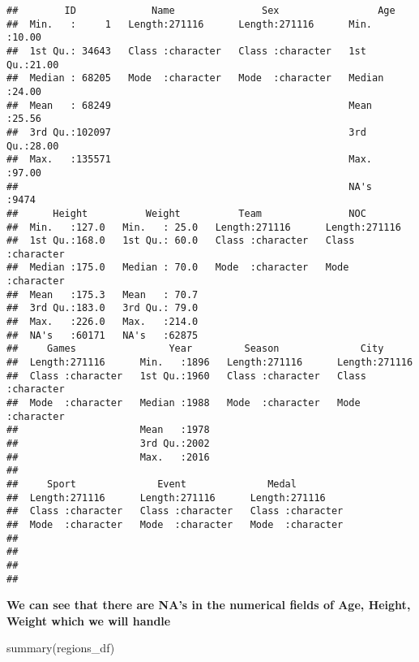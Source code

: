 \documentclass[
]{article}
\newenvironment{Shaded}{\begin{snugshade}}{\end{snugshade}}
\newcommand{\FunctionTok}[1]{\textcolor[rgb]{0.00,0.00,0.00}{#1}}
\newcommand{\NormalTok}[1]{#1}
\begin{document}
\begin{verbatim}
##        ID             Name               Sex                 Age       
##  Min.   :     1   Length:271116      Length:271116      Min.   :10.00  
##  1st Qu.: 34643   Class :character   Class :character   1st Qu.:21.00  
##  Median : 68205   Mode  :character   Mode  :character   Median :24.00  
##  Mean   : 68249                                         Mean   :25.56  
##  3rd Qu.:102097                                         3rd Qu.:28.00  
##  Max.   :135571                                         Max.   :97.00  
##                                                         NA's   :9474   
##      Height          Weight          Team               NOC           
##  Min.   :127.0   Min.   : 25.0   Length:271116      Length:271116     
##  1st Qu.:168.0   1st Qu.: 60.0   Class :character   Class :character  
##  Median :175.0   Median : 70.0   Mode  :character   Mode  :character  
##  Mean   :175.3   Mean   : 70.7                                        
##  3rd Qu.:183.0   3rd Qu.: 79.0                                        
##  Max.   :226.0   Max.   :214.0                                        
##  NA's   :60171   NA's   :62875                                        
##     Games                Year         Season              City          
##  Length:271116      Min.   :1896   Length:271116      Length:271116     
##  Class :character   1st Qu.:1960   Class :character   Class :character  
##  Mode  :character   Median :1988   Mode  :character   Mode  :character  
##                     Mean   :1978                                        
##                     3rd Qu.:2002                                        
##                     Max.   :2016                                        
##                                                                         
##     Sport              Event              Medal          
##  Length:271116      Length:271116      Length:271116     
##  Class :character   Class :character   Class :character  
##  Mode  :character   Mode  :character   Mode  :character  
##                                                          
##                                                          
##                                                          
## 
\end{verbatim}

\textbf{We can see that there are NA's in the numerical fields of Age,
Height, Weight which we will handle}

\begin{Shaded}
\begin{Highlighting}[]
\FunctionTok{summary}\NormalTok{(regions\_df)}
\end{Highlighting}
\end{Shaded}
\end{document}
